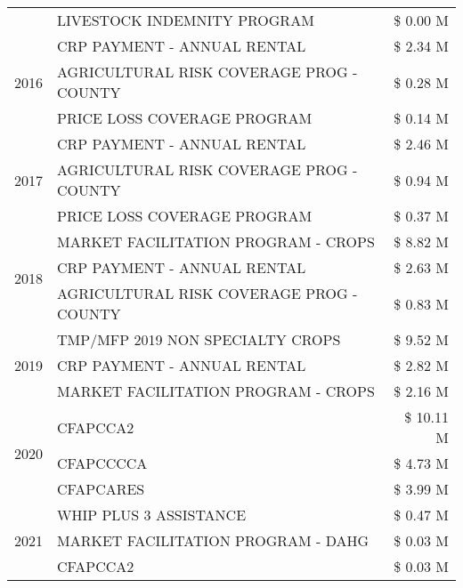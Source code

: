 \begin{tabular}{llr}
 & LIVESTOCK INDEMNITY PROGRAM & \$ 0.00 M \\
\cline{1-3}
\multirow[t]{3}{*}{2016} & CRP PAYMENT - ANNUAL RENTAL & \$ 2.34 M \\
 & AGRICULTURAL RISK COVERAGE PROG - COUNTY & \$ 0.28 M \\
 & PRICE LOSS COVERAGE PROGRAM & \$ 0.14 M \\
\cline{1-3}
\multirow[t]{3}{*}{2017} & CRP PAYMENT - ANNUAL RENTAL & \$ 2.46 M \\
 & AGRICULTURAL RISK COVERAGE PROG - COUNTY & \$ 0.94 M \\
 & PRICE LOSS COVERAGE PROGRAM & \$ 0.37 M \\
\cline{1-3}
\multirow[t]{3}{*}{2018} & MARKET FACILITATION PROGRAM - CROPS & \$ 8.82 M \\
 & CRP PAYMENT - ANNUAL RENTAL & \$ 2.63 M \\
 & AGRICULTURAL RISK COVERAGE PROG - COUNTY & \$ 0.83 M \\
\cline{1-3}
\multirow[t]{3}{*}{2019} & TMP/MFP 2019 NON SPECIALTY CROPS & \$ 9.52 M \\
 & CRP PAYMENT - ANNUAL RENTAL & \$ 2.82 M \\
 & MARKET FACILITATION PROGRAM - CROPS & \$ 2.16 M \\
\cline{1-3}
\multirow[t]{3}{*}{2020} & CFAPCCA2 & \$ 10.11 M \\
 & CFAPCCCCA & \$ 4.73 M \\
 & CFAPCARES & \$ 3.99 M \\
\cline{1-3}
\multirow[t]{3}{*}{2021} & WHIP PLUS 3 ASSISTANCE & \$ 0.47 M \\
 & MARKET FACILITATION PROGRAM - DAHG & \$ 0.03 M \\
 & CFAPCCA2 & \$ 0.03 M \\
\cline{1-3}
\bottomrule
\end{tabular}
